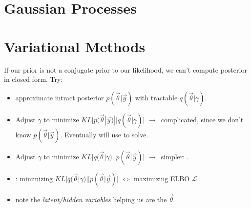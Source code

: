 \documentclass[11pt]{article}
\begin{document}
\section{Gaussian Processes}
\label{sec:gp}



\section{Variational Methods}
\label{sec:var_meth}

If our prior is not a conjugate prior to our likelihood, we can't compute
posterior in closed form. Try:

\begin{itemize}
  \item approximate intract posterior $p(\vec{\theta} | \vec{y})$ with tractable
  $q(\vec{\theta} | \gamma)$.
  \item Adjust $\gamma$ to minimize
  $KL \big[p(\vec{\theta} | \vec{y}) || q(\vec{\theta} | \gamma)\big]$ $\to\,$
  complicated, since we don't know $p(\vec{\theta} | \vec{y})$. Eventually will
  use  to solve.
  \item Adjust $\gamma$ to minimize
  $KL \big[q(\vec{\theta} | \gamma) || p(\vec{\theta} | \vec{y})\big]$ $\to\,$
  simpler: .
  \item {}: minimizing $KL \big[q(\vec{\theta} | \gamma) ||
  p(\vec{\theta} | \vec{y})\big]$ $\iff$ maximizing ELBO $\mathcal{L}$
  \item note the \emph{latent/hidden variables} helping us are the $\vec{\theta}$
\end{itemize}
\end{document}
